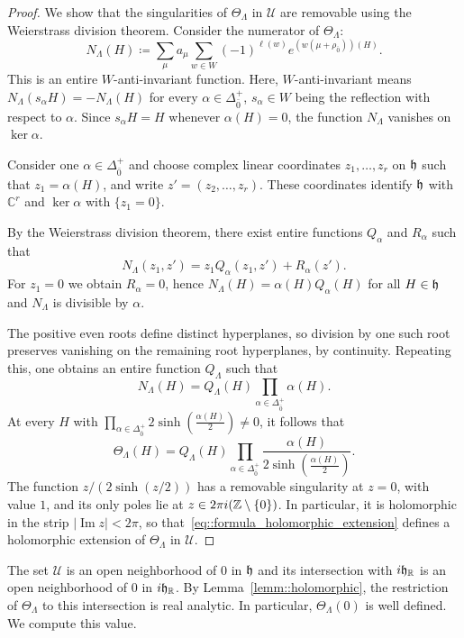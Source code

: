 \begin{proof}
We show that the singularities of $\Theta_\Lambda$ in $\mathcal U$ are removable using the Weierstrass division theorem. Consider the numerator of $\Theta_{\Lambda}$:
\[
N_\Lambda(H)
\coloneqq
\sum_\mu a_\mu
\sum_{w\in W}(-1)^{\ell(w)}
e^{(w(\mu+\rho_{\bar0}))(H)}.
\]
This is an entire $W$-anti-invariant function. Here, $W$-anti-invariant means $N_\Lambda(s_\alpha H)=-N_\Lambda(H)$ for every $\alpha\in\Delta_{\bar0}^+$, $s_{\alpha}\in W$ being the reflection with respect to $\alpha$. Since $s_\alpha H=H$ whenever $\alpha(H)=0$, the function $N_\Lambda$ vanishes on $\ker\alpha$.

Consider one $\alpha \in \Delta_{\bar{0}}^{+}$ and choose complex linear coordinates $z_1,\dots,z_r$ on ${\mathfrak h}$ such that $z_1=\alpha(H)$, and write $z'=(z_2,\dots,z_r)$. These coordinates identify ${\mathfrak h}$ with $\mathbb C^r$ and $\ker\alpha$ with $\{z_1=0\}$.

By the Weierstrass division theorem, there exist entire functions $Q_\alpha$ and $R_\alpha$ such that
\[
N_\Lambda(z_1,z')
=
z_1Q_\alpha(z_1,z')+R_\alpha(z').
\]
For $z_1=0$ we obtain $R_\alpha=0$, hence
$
N_\Lambda(H)=\alpha(H)Q_\alpha(H)
$
for all $H\in{\mathfrak h}$ and $N_{\Lambda}$ is divisible by $\alpha$. 

The positive even roots define distinct hyperplanes,
so division by one such root preserves vanishing
on the remaining root hyperplanes, by continuity. Repeating this, one obtains an entire function $Q_\Lambda$ such that
\[
N_\Lambda(H)
=
Q_\Lambda(H)
\prod_{\alpha\in\Delta_{\bar0}^+}\alpha(H).
\]
At every $H$ with $\prod_{\alpha\in\Delta_{\bar0}^+}2\sinh\!\left(\frac{\alpha(H)}2\right)\neq0$, it follows that
\begin{equation}\label{eq::formula_holomorphic_extension}
\Theta_\Lambda(H)
=
Q_\Lambda(H)
\prod_{\alpha\in\Delta_{\bar0}^+}
\frac{\alpha(H)}
{2\sinh\!\left(\frac{\alpha(H)}2\right)}.
\end{equation}
The function $z/(2\sinh(z/2))$ has a removable singularity at $z=0$, with value $1$, and its only poles lie at $z\in2\pi i({\mathbb Z}\setminus\{0\})$. In particular, it is holomorphic in the strip $|\operatorname{Im}z|<2\pi$, so that~\eqref{eq::formula_holomorphic_extension} defines a holomorphic extension of $\Theta_{\Lambda}$ in $\mathcal{U}$.
\end{proof}

The set $\mathcal U$ is an open neighborhood of $0$ in ${\mathfrak h}$ and its intersection with $i{\mathfrak h}_{{\mathbb R}}$ is an open neighborhood of $0$ in $i{\mathfrak h}_{{\mathbb R}}$. By Lemma~\ref{lemm::holomorphic}, the restriction of $\Theta_\Lambda$ to this intersection is real analytic. In particular, $\Theta_\Lambda(0)$ is well defined. We compute this value.


